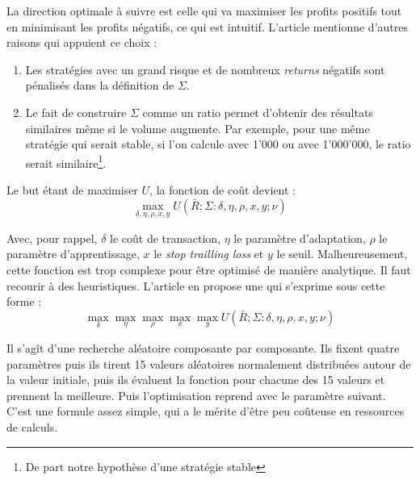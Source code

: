 \documentclass[a4paper, 11pt]{article}
\begin{document}
La direction optimale à suivre est celle qui va maximiser les profits positifs tout en minimisant les profits négatifs, ce qui est intuitif.
L'article mentionne d'autres raisons qui appuient ce choix \cite{fx_trading}:
\begin{enumerate}
 \item Les stratégies avec un grand risque et de nombreux \textit{returns} négatifs sont pénalisés dans la définition de $\Sigma$.
 \item Le fait de construire $\Sigma$ comme un ratio permet d'obtenir des résultats similaires même si le volume augmente. Par exemple, pour une même
 stratégie qui serait stable, si l'on calcule avec 1'000 ou avec 1'000'000, le ratio serait similaire\footnote{De part notre hypothèse d'une stratégie stable}.
\end{enumerate}

Le but étant de maximiser $U$, la fonction de coût devient :
$$\max\limits_{\delta, \eta, \rho, x, y} U(\bar{R};\Sigma : \delta, \eta, \rho, x, y; \nu)$$

Avec, pour rappel, $\delta$ le coût de transaction, $\eta$ le paramètre d'adaptation, $\rho$ le paramètre d'apprentissage, $x$ le \textit{stop trailling
loss} et $y$ le seuil. Malheureusement, cette fonction est trop complexe pour être optimisé de manière analytique. Il faut recourir à des heuristiques.
L'article en propose une qui s'exprime sous cette forme :
$$\max\limits_{\delta} \max\limits_{\eta} \max\limits_{\rho} \max\limits_{x} \max\limits_{y} U(\bar{R};\Sigma : \delta, \eta, \rho, x, y; \nu)$$

Il s'agît d'une recherche aléatoire composante par composante. Ils fixent quatre paramètres puis ils tirent 15 valeurs aléatoires normalement distribuées
autour de la valeur initiale, puis ils évaluent la fonction pour chacune des 15 valeurs et prennent la meilleure. Puis l'optimisation reprend avec le 
paramètre suivant. C'est une formule assez simple, qui a le mérite d'être peu coûteuse en ressources de calculs.
\end{document}
